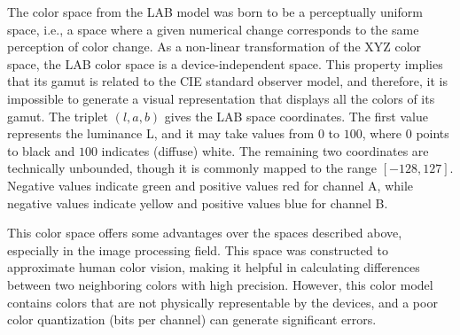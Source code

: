 The color space from the LAB model was born to be a perceptually uniform space, i.e., a space where a given numerical change corresponds to the same perception of color change. As a non-linear transformation of the XYZ color space, the LAB color space is a device-independent space. This property implies that its gamut is related to the CIE standard observer model, and therefore, it is impossible to generate a visual representation that displays all the colors of its gamut. The triplet $(l,a,b)$ gives the LAB space coordinates. The first value represents the luminance L, and it may take values from $0$ to $100$, where $0$ points to black and $100$ indicates (diffuse) white. The remaining two coordinates are technically unbounded, though it is commonly mapped to the range $[-128, 127]$. Negative values indicate green and positive values red for channel A, while negative values indicate yellow and positive values blue for channel B.

This color space offers some advantages over the spaces described above, especially in the image processing field. This space was constructed to approximate human color vision, making it helpful in calculating differences between two neighboring colors with high precision. However, this color model contains colors that are not physically representable by the devices, and a poor color quantization (bits per channel) can generate significant errors.

